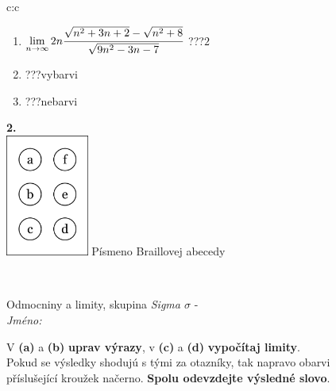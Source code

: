 \documentclass[10pt]{report}
\begin{document}
\begin{tabular}{c:c}
\begin{minipage}[c][104.5mm][t]{0.5\linewidth}
\begin{center}
\begin{minipage}{0.79\linewidth}
\begin{center}
\begin{varwidth}{\linewidth}
\begin{enumerate}
\item $\lim\limits_{n\to\infty}2n\cfrac{\sqrt{n^2+3n+2}-\sqrt{n^2+8}}{\sqrt{9n^2-3n-7}}$\quad \dotfill\; ???\;\dotfill \quad $2$
\item \quad \dotfill\; ???\;\dotfill \quad vybarvi
\item \quad \dotfill\; ???\;\dotfill \quad nebarvi
\end{enumerate}
\end{varwidth}
\end{center}
\end{minipage}
\begin{minipage}{0.20\linewidth}
\begin{center}
{\Huge\bfseries 2.} \\[2mm]
\includegraphics[height=40mm]{../images/braille.png}
{\small Písmeno Braillovej abecedy}
\end{center}
\end{minipage}
\end{center}
\end{minipage}
\\ \hdashline
\begin{minipage}[c][104.5mm][t]{0.5\linewidth}
\begin{center}
\vspace{7mm}
{\huge Odmocniny a limity, skupina \textit{Sigma $\sigma$} -}\\[5mm]
\textit{Jméno:}\phantom{xxxxxxxxxxxxxxxxxxxxxxxxxxxxxxxxxxxxxxxxxxxxxxxxxxxxxxxxxxxxxxxxx}\\[5mm]
\begin{minipage}{0.95\linewidth}
\begin{center}
V \textbf{(a)} a \textbf{(b)} \textbf{uprav výrazy}, v \textbf{(c)} a \textbf{(d)} \textbf{vypočítaj limity}.\\Pokud se výsledky shodujú s tými za otazníky, tak napravo obarvi\\příslušející kroužek načerno. \textbf{Spolu odevzdejte výsledné slovo}.
\end{center}
\end{minipage}
\\[1mm]

\end{center}
\end{minipage}
\end{tabular}
\end{document}
